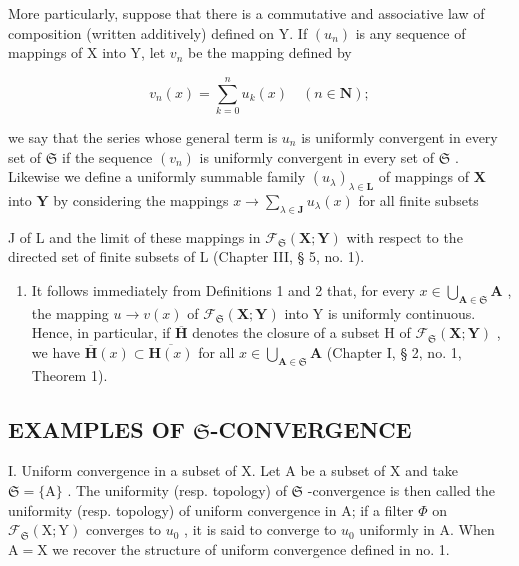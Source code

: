 More particularly, suppose that there is a commutative and associative law of composition (written additively) defined on Y. If \((u_{n})\) is any sequence of mappings of X into Y, let \(v_{n}\) be the mapping defined by

\[
v _ {n} (x) = \sum_ {k = 0} ^ {n} u _ {k} (x) \quad (n \in \mathbf {N});
\]

we say that the series whose general term is \(u_n\) is uniformly convergent in every set of \(\mathfrak{S}\) if the sequence \((v_n)\) is uniformly convergent in every set of \(\mathfrak{S}\) . Likewise we define a uniformly summable family \((u_\lambda)_{\lambda \in \mathbf{L}}\) of mappings of \(\mathbf{X}\) into \(\mathbf{Y}\) by considering the mappings \(x \to \sum_{\lambda \in \mathbf{J}} u_\lambda(x)\) for all finite subsets

J of L and the limit of these mappings in \(\mathcal{F}_{\mathfrak{S}}(\mathbf{X};\mathbf{Y})\) with respect to the directed set of finite subsets of L (Chapter III, § 5, no. 1).

\begin{enumerate}
\def\labelenumi{\arabic{enumi})}
\setcounter{enumi}{5}
\tightlist
\item
  It follows immediately from Definitions 1 and 2 that, for every \(x \in \bigcup_{\mathbf{A} \in \mathfrak{S}} \mathbf{A}\) , the mapping \(u \to v(x)\) of \(\mathcal{F}_{\mathfrak{S}}(\mathbf{X}; \mathbf{Y})\) into Y is uniformly continuous. Hence, in particular, if \(\overline{\mathbf{H}}\) denotes the closure of a subset H of \(\mathcal{F}_{\mathfrak{S}}(\mathbf{X}; \mathbf{Y})\) , we have \(\overline{\mathbf{H}}(x) \subset \overline{\mathbf{H}(x)}\) for all \(x \in \bigcup_{\mathbf{A} \in \mathfrak{S}} \mathbf{A}\) (Chapter I, § 2, no. 1, Theorem 1).
\end{enumerate}

\subsection{\texorpdfstring{EXAMPLES OF \(\mathfrak{S}\)-CONVERGENCE}{EXAMPLES OF S-CONVERGENCE}}

I. Uniform convergence in a subset of X. Let A be a subset of X and take \(\mathfrak{S} = \{\mathrm{A}\}\) . The uniformity (resp. topology) of \(\mathfrak{S}\) -convergence is then called the uniformity (resp. topology) of uniform convergence in A; if a filter \(\Phi\) on \(\mathcal{F}_{\mathfrak{S}}(\mathrm{X};\mathrm{Y})\) converges to \(u_0\) , it is said to converge to \(u_0\) uniformly in A. When \(\mathrm{A} = \mathrm{X}\) we recover the structure of uniform convergence defined in no. 1.


